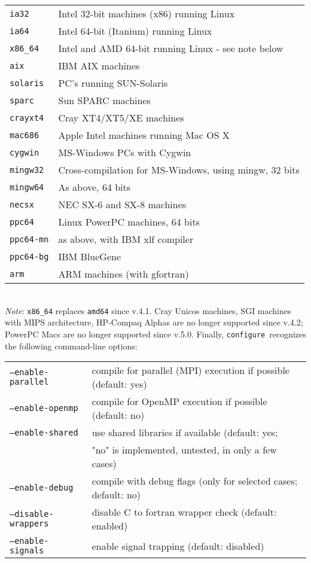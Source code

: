 \documentclass[12pt,a4paper]{article}
\def\configure{\texttt{configure}}
\begin{document}
\begin{tabular}{ll}
\texttt{ia32}&    Intel 32-bit machines (x86) running Linux\\
\texttt{ia64}&    Intel 64-bit (Itanium) running Linux\\
\texttt{x86\_64}&  Intel and AMD 64-bit running Linux - see note below\\
\texttt{aix}&     IBM AIX machines\\
\texttt{solaris}& PC's running SUN-Solaris\\
\texttt{sparc}&   Sun SPARC machines\\
\texttt{crayxt4}& Cray XT4/XT5/XE machines\\
\texttt{mac686}&  Apple Intel machines running Mac OS X\\
\texttt{cygwin}&  MS-Windows PCs with Cygwin\\
\texttt{mingw32}& Cross-compilation for MS-Windows, using mingw, 32 bits\\
\texttt{mingw64}& As above, 64 bits\\
\texttt{necsx}&   NEC SX-6 and SX-8 machines\\
\texttt{ppc64}&   Linux PowerPC machines, 64 bits\\
\texttt{ppc64-mn}&as above, with IBM xlf compiler\\
\texttt{ppc64-bg}&IBM BlueGene\\
\texttt{arm}     &ARM machines (with gfortran)
\end{tabular}\\
{\em Note}: \texttt{x86\_64} replaces \texttt{amd64} since v.4.1. 
Cray Unicos machines, SGI 
machines with MIPS architecture, HP-Compaq Alphas are no longer supported
since v.4.2; PowerPC Macs are no longer
supported since v.5.0.
Finally, \configure\ recognizes the following command-line options:\\
\begin{tabular}{ll}
\texttt{--enable-parallel}&     compile for parallel (MPI) execution if possible (default: yes)\\
\texttt{--enable-openmp}&       compile for OpenMP execution if possible (default: no)\\
\texttt{--enable-shared}&       use shared libraries if available (default: yes;\\
                        &       "no" is implemented, untested, in only a few cases)\\
\texttt{--enable-debug}&        compile with debug flags (only for selected cases; default: no)\\
\texttt{--disable-wrappers}&    disable C to fortran wrapper check (default: enabled)\\
\texttt{--enable-signals}&      enable signal trapping (default: disabled)\\
\end{tabular}\\
\end{document}
